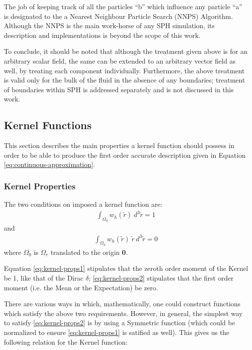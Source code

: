 The job of keeping track of all the particles ``b'' which influence any particle ``a'' is designated to the a Nearest Neighbour Particle Search (NNPS) Algorithm. Although the NNPS is the main work-horse of any SPH simulation, its description and implementations is beyond the scope of this work. 

To conclude, it should be noted that although the treatment given above is for an arbitrary scalar field, the same can be extended to an arbitrary vector field as well, by treating each component individually. Furthermore, the above treatment is valid only for the bulk of the fluid in the absence of any boundaries; treatment of boundaries within SPH is addressed separately and is not discussed in this work.

\subsection{Kernel Functions} \label{ssec:kernels}

This section describes the main properties a kernel function should possess in order to be able to produce the first order accurate description given in Equation \eqref{eq:continuous-approximation}.

\subsubsection{Kernel Properties}
 The two conditions on imposed a kernel function are:
 \begin{eqnarray} \label{eq:kernel-props1} 
  \int_{\varOmega_0} \textit{w$_h(\widetilde{r}) ~d^{3}\widetilde{r}$} = 1
 \end{eqnarray}
 and
 \begin{eqnarray}\label{eq:kernel-props2}
  \int_{\varOmega_0} \textit{w$_h(\widetilde{r})~ \widetilde{r}~ d^{3}\widetilde{r}$} = 0 
 \end{eqnarray} 
 where ${\varOmega_0}$ is ${\varOmega_r}$ translated to the origin \textbf{0}.
 

 Equation \eqref{eq:kernel-props1} stipulates that the zeroth order moment of the Kernel be 1, like that of the Dirac $\delta$; \eqref{eq:kernel-props2} stipulates that the first order moment (i.e. the Mean or the Expectation) be zero. 
 
 There are various ways in which, mathematically, one could construct functions which satisfy the above two requirements. However, in general, the simplest way to satisfy \eqref{eq:kernel-props2} is by using a Symmetric function (which could be normalized to ensure \eqref{eq:kernel-props1} is satified as well). \newpage This gives us the following relation for the Kernel function:
 
